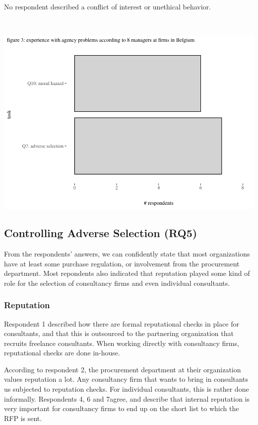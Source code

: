 \documentclass[12pt]{article}
\begin{document}
No respondent described a conflict of interest or unethical behavior.

\(~\)

\begin{center}\includegraphics[width=0.75\linewidth]{2_ams_five_pager_files/figure-latex/unnamed-chunk-5-1} \end{center}

\subsection{Controlling Adverse Selection
(RQ5)}\label{controlling-adverse-selection-rq5}

From the respondents' answers, we can confidently state that most
organizations have at least some purchase regulation, or involvement
from the procurement department. Most repondents also indicated that
reputation played some kind of role for the selection of consultancy
firms and even individual consultants.

\subsubsection{Reputation}\label{reputation-1}

Respondent 1 described how there are formal reputational checks in place
for consultants, and that this is outsourced to the partnering
organization that recruits freelance consultants. When working directly
with consultancy firms, reputational checks are done in-house.

According to respondent 2, the procurement department at their
organization values reputation a lot. Any consultancy firm that wants to
bring in consultants us subjected to reputation checks. For individual
consultants, this is rather done informally. Respondents 4, 6 and
7agree, and describe that internal reputation is very important for
consultancy firms to end up on the short list to which the RFP is sent.
\end{document}
